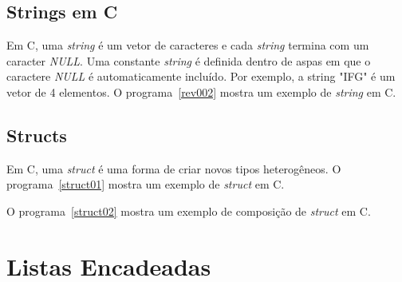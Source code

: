 \documentclass[11pt,fleqn]{book} %
\begin{document}
\label{rev001}

\label{rev003}

\subsection*{Strings em C}
Em C, uma \textit{string} é um vetor de caracteres e cada \textit{string} termina com um caracter \textit{NULL}.
Uma constante \textit{string} é definida dentro de aspas em que o caractere \textit{NULL} é automaticamente incluído.
Por exemplo, a string "IFG" é um vetor de 4 elementos.
O programa~\ref{rev002} mostra um exemplo de \textit{string} em C. 
\label{rev002}



\subsection*{Structs}
Em C, uma \textit{struct} é uma forma de criar novos tipos heterogêneos.
O programa~\ref{struct01} mostra um exemplo de \textit{struct} em C. 

\newpage
\label{struct01}

\newpage
O programa~\ref{struct02} mostra um exemplo de composição de \textit{struct} em C. 
\label{struct02}

\section{Listas Encadeadas}
\end{document}
